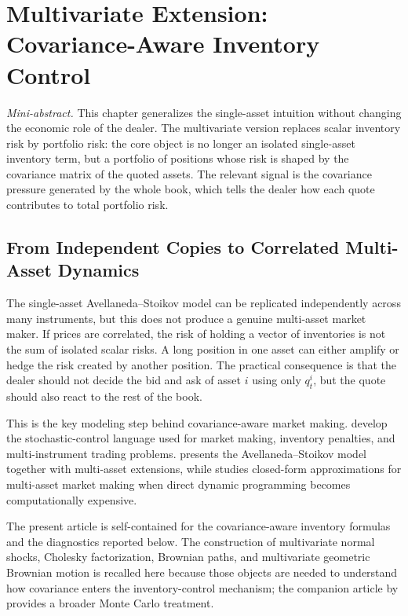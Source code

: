 \documentclass[a4paper,10pt,titlepage,oneside,openany]{book}
\providecommand{\textcite}[1]{\cite{#1}}
\theoremstyle{plain}\newtheorem{theorem}{Theorem}[chapter]
\theoremstyle{definition}\newtheorem{definition}{Definition}[chapter]
\theoremstyle{remark}\newtheorem{remark}{Remark}[chapter]
\newcommand{\miniabstract}[1]{%
\vspace{-2pt}
\begin{tcolorbox}[colback=gray!6,colframe=black!15,boxrule=0.3pt,arc=3pt,left=6pt,right=6pt,top=4pt,bottom=4pt]
\textit{Mini-abstract.} #1
\end{tcolorbox}
\vspace{-4pt}
}
\begin{document}
\chapter{Multivariate Extension: Covariance-Aware Inventory Control}
\miniabstract{This chapter generalizes the single-asset intuition without changing the economic role of the dealer. The multivariate version replaces scalar inventory risk by portfolio risk: the core object is no longer an isolated single-asset inventory term, but a portfolio of positions whose risk is shaped by the covariance matrix of the quoted assets. The relevant signal is the covariance pressure generated by the whole book, which tells the dealer how each quote contributes to total portfolio risk.}

\section{From Independent Copies to Correlated Multi-Asset Dynamics}

The single-asset Avellaneda--Stoikov model can be replicated independently across many instruments, but this does not produce a genuine multi-asset market maker. If prices are correlated, the risk of holding a vector of inventories is not the sum of isolated scalar risks. A long position in one asset can either amplify or hedge the risk created by another position. The practical consequence is that the dealer should not decide the bid and ask of asset $i$ using only $q_t^i$, but the quote should also react to the rest of the book.

This is the key modeling step behind covariance-aware market making. \textcite{CarteaJaimungalPenalva2015} develop the stochastic-control language used for market making, inventory penalties, and multi-instrument trading problems. \textcite{Gueant2016} presents the Avellaneda--Stoikov model together with multi-asset extensions, while \textcite{BergaultEvangelistaGueantVieira2022} studies closed-form approximations for multi-asset market making when direct dynamic programming becomes computationally expensive.

The present article is self-contained for the covariance-aware inventory formulas and the diagnostics reported below. The construction of multivariate normal shocks, Cholesky factorization, Brownian paths, and multivariate geometric Brownian motion is recalled here because those objects are needed to understand how covariance enters the inventory-control mechanism; the companion article by \textcite{RostagnoFlorio2026MonteCarlo} provides a broader Monte Carlo treatment.
\end{document}
